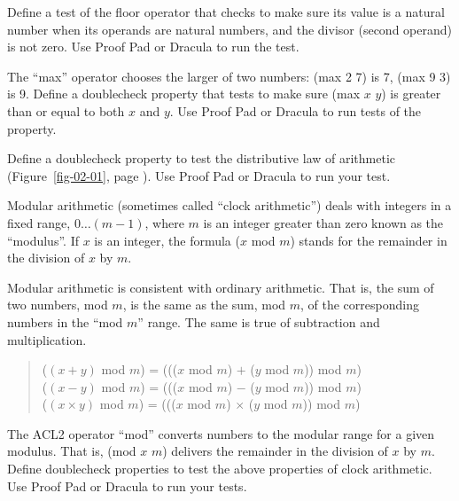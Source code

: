 \begin{ExerciseList}
\Exercise Define a test of the floor operator
that checks to make sure its value is a natural number
when its operands are natural numbers,
and the divisor (second operand) is not zero.
Use Proof Pad or Dracula to run the test.

\Exercise The ``max'' operator chooses the larger of two numbers:
(max 2 7) is 7, (max 9 3) is 9.
Define a doublecheck property that tests to make sure
(max $x$ $y$) is greater than or equal to both $x$ and $y$.
Use Proof Pad or Dracula to run tests of the property.

\Exercise
Define a doublecheck property to test the distributive law
of arithmetic (Figure~\ref{fig-02-01}, page \pageref{fig-02-01}).
Use Proof Pad or Dracula to run your test.

\Exercise
\label{modular-arithmetic}
Modular arithmetic (sometimes called ``clock arithmetic'')
deals with integers in a fixed range, $0 \dots (m - 1)$,
where $m$ is an integer greater than zero known as
the ``modulus''.
If $x$ is an integer, the formula ($x$ mod $m$) stands for
the remainder in the division of $x$ by $m$.

Modular arithmetic is consistent with ordinary arithmetic.
That is, the sum of two numbers, mod $m$,
is the same as the sum, mod $m$, of the corresponding numbers
in the ``mod $m$'' range.
The same is true of subtraction and multiplication.

\begin{quote}
($(x + y)$ mod $m$) = ((($x$ mod $m$) $+$ ($y$ mod $m$)) mod $m$) \\
($(x - y)$ mod $m$) = ((($x$ mod $m$) $-$ ($y$ mod $m$)) mod $m$) \\
($(x \times y)$ mod $m$) = ((($x$ mod $m$) $\times$ ($y$ mod $m$)) mod $m$)
\end{quote}

The ACL2 operator ``mod'' converts numbers to the modular range
for a given modulus. That is, (mod $x$ $m$) delivers the remainder
in the division of $x$ by $m$.
Define doublecheck properties to test the above properties of clock arithmetic.
Use Proof Pad or Dracula to run your tests.
\end{ExerciseList}



